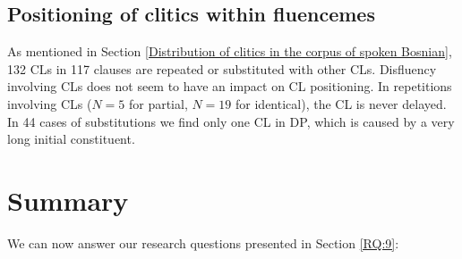
\subsection{Positioning of clitics within fluencemes}

As mentioned in Section \ref{Distribution of clitics in the corpus of spoken Bosnian}, 132 CLs in 117 clauses are repeated or substituted with other CLs. Disfluency involving CLs does not seem to have an impact on CL positioning. In repetitions involving CLs ($N=5$ for partial, $N=19$ for identical), the CL is never delayed. In 44 cases of substitutions we find only one CL in DP, which is caused by a very long initial constituent.

\section{Summary}
\label{Summary:9}
We can now answer our research questions presented in Section \ref{RQ:9}:

